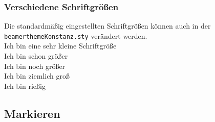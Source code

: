 \documentclass[rgb]{beamer}
\begin{document}
%
%
%
%
%
% 
%
%
%
%                    
%
%

\begin{frame}[t]
	\frametitle{Verschiedene Schriftgrößen}
	Die standardmäßig eingestellten Schriftgrößen können auch in der \texttt{beamerthemeKonstanz.sty} verändert werden.\\[\baselineskip]
	 Ich bin eine sehr kleine Schriftgröße\\
	 Ich bin schon größer\\
	 Ich bin noch größer\\
	 Ich bin ziemlich groß\\
	 Ich bin rießig\\
\end{frame}

\subsection{Markieren}
\end{document}
